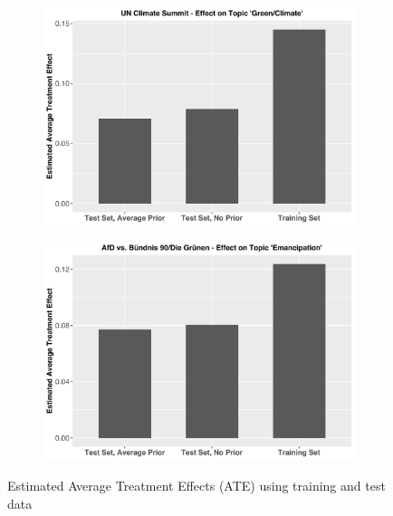\begin{figure}[h!]
  \centering
  \captionsetup{justification=centering,margin=2cm}
  \begin{subfigure}[b]{0.49\linewidth}
    \includegraphics[width=\linewidth]{../plots/4_7/climate_summit_ate.pdf}
  \end{subfigure}
  \begin{subfigure}[b]{0.49\linewidth}
    \includegraphics[width=\linewidth]{../plots/4_7/emancipation_ate.pdf}
  \end{subfigure}
  \caption{Estimated Average Treatment Effects (ATE) using training and test data}
  \label{fig:causal_inference_ate}
\end{figure}
